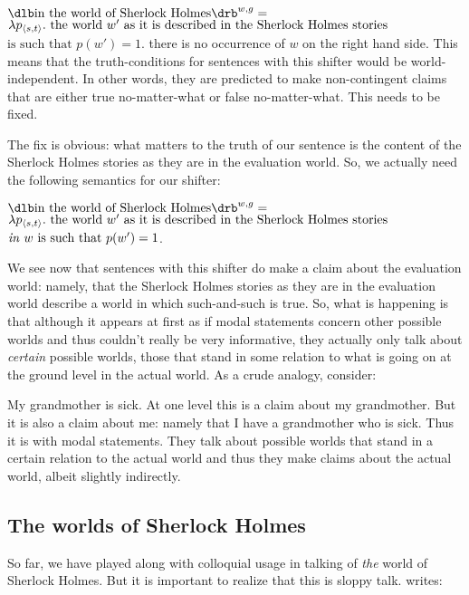 \ex $\svt{in the world of Sherlock Holmes}^{w,g} =$\\
$\lambda p_{\langle s,t \rangle}.\ \mbox{the world } w' \mbox{ as it is described in the
  Sherlock Holmes stories}$\\
$\mbox{is such that } p(w') = 1$.
\xe
%
there is no occurrence of $w$ on the right hand side. This means that the
truth-conditions for sentences with this shifter would be world-independent. In
other words, they are predicted to make non-contingent claims that are either
true no-matter-what or false no-matter-what. This needs to be fixed.

The fix is obvious: what matters to the truth of our sentence is the content of
the Sherlock Holmes stories as they are in the evaluation world. So, we actually
need the following semantics for our shifter:

\ex $\svt{in the world of Sherlock Holmes}^{w,g} =$\\
$\lambda p_{\langle s,t \rangle}.\ \mbox{the world } w' \mbox{ as it is described in the
  Sherlock Holmes stories}$\\
$\mbox{\emph{in} } w \mbox{ is such that } p(w') = 1$. \xe

We see now that sentences with this shifter do make a claim about the evaluation
world: namely, that the Sherlock Holmes stories as they are in the evaluation
world describe a world in which such-and-such is true. So, what is happening is
that although it appears at first as if modal statements concern other possible
worlds and thus couldn't really be very informative, they actually only talk
about \emph{certain} possible worlds, those that stand in some relation to what
is going on at the ground level in the actual world. As a crude analogy,
consider:

\ex My grandmother is sick. \xe
%
At one level this is a claim about my grandmother. But it is also a claim about
me: namely that I have a grandmother who is sick. Thus it is with modal
statements. They talk about possible worlds that stand in a certain relation to
the actual world and thus they make claims about the actual world, albeit
slightly indirectly.

\subsection{The worlds of Sherlock Holmes} \label{sec:worlds-sherl-holm}

So far, we have played along with colloquial usage in talking of \emph{the}
world of Sherlock Holmes. But it is important to realize that this is sloppy
talk. \citet{lewis-1978-fiction} writes:

